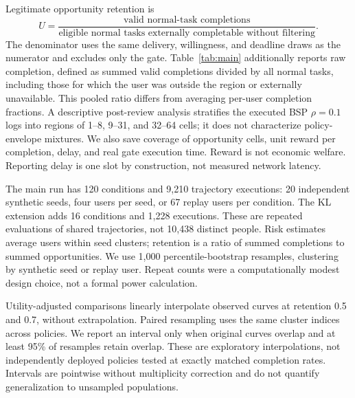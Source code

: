 \documentclass[3p,times]{elsarticle}
\begin{document}
Legitimate opportunity retention is
\begin{equation}
 U=\frac{\text{valid normal-task completions}}{\text{eligible normal tasks externally completable without filtering}}.
 \label{eq:utility}
\end{equation}
The denominator uses the same delivery, willingness, and deadline draws as the numerator and excludes only the gate. Table~\ref{tab:main} additionally reports raw completion, defined as summed valid completions divided by all normal tasks, including those for which the user was outside the region or externally unavailable. This pooled ratio differs from averaging per-user completion fractions. A descriptive post-review analysis stratifies the executed BSP $\rho=0.1$ logs into regions of 1--8, 9--31, and 32--64 cells; it does not characterize policy-envelope mixtures. We also save coverage of opportunity cells, unit reward per completion, delay, and real gate execution time. Reward is not economic welfare. Reporting delay is one slot by construction, not measured network latency.

The main run has 120 conditions and 9,210 trajectory executions: 20 independent synthetic seeds, four users per seed, or 67 replay users per condition. The KL extension adds 16 conditions and 1,228 executions. These are repeated evaluations of shared trajectories, not 10,438 distinct people. Risk estimates average users within seed clusters; retention is a ratio of summed completions to summed opportunities. We use 1,000 percentile-bootstrap resamples, clustering by synthetic seed or replay user. Repeat counts were a computationally modest design choice, not a formal power calculation.

Utility-adjusted comparisons linearly interpolate observed curves at retention 0.5 and 0.7, without extrapolation. Paired resampling uses the same cluster indices across policies. We report an interval only when original curves overlap and at least 95\% of resamples retain overlap. These are exploratory interpolations, not independently deployed policies tested at exactly matched completion rates. Intervals are pointwise without multiplicity correction and do not quantify generalization to unsampled populations.
\end{document}
